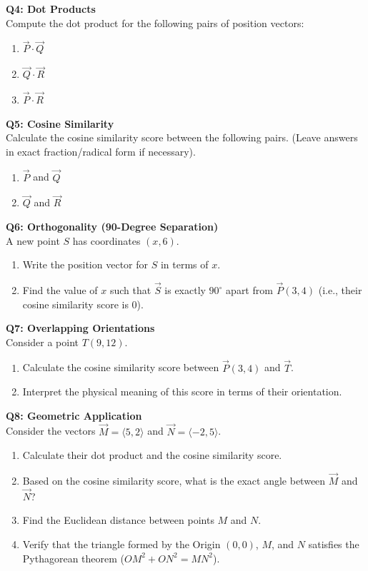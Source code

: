 \documentclass[11pt]{article}
\begin{document}
\textbf{Q4: Dot Products}\\
Compute the dot product for the following pairs of position vectors:
\begin{enumerate}
    \item[(a)] $\vec{P} \cdot \vec{Q}$
    \item[(b)] $\vec{Q} \cdot \vec{R}$
    \item[(c)] $\vec{P} \cdot \vec{R}$
\end{enumerate}

\textbf{Q5: Cosine Similarity}\\
Calculate the cosine similarity score between the following pairs. (Leave answers in exact fraction/radical form if necessary).
\begin{enumerate}
    \item[(a)] $\vec{P}$ and $\vec{Q}$
    \item[(b)] $\vec{Q}$ and $\vec{R}$
\end{enumerate}

\textbf{Q6: Orthogonality (90-Degree Separation)}\\
A new point $S$ has coordinates $(x, 6)$.
\begin{enumerate}
    \item[(a)] Write the position vector for $S$ in terms of $x$.
    \item[(b)] Find the value of $x$ such that $\vec{S}$ is exactly $90^\circ$ apart from $\vec{P}(3, 4)$ (i.e., their cosine similarity score is $0$).
\end{enumerate}

\textbf{Q7: Overlapping Orientations}\\
Consider a point $T(9, 12)$.
\begin{enumerate}
    \item[(a)] Calculate the cosine similarity score between $\vec{P}(3, 4)$ and $\vec{T}$.
    \item[(b)] Interpret the physical meaning of this score in terms of their orientation.
\end{enumerate}

\textbf{Q8: Geometric Application}\\
Consider the vectors $\vec{M} = \langle 5, 2 \rangle$ and $\vec{N} = \langle -2, 5 \rangle$.
\begin{enumerate}
    \item[(a)] Calculate their dot product and the cosine similarity score.
    \item[(b)] Based on the cosine similarity score, what is the exact angle between $\vec{M}$ and $\vec{N}$?
    \item[(c)] Find the Euclidean distance between points $M$ and $N$.
    \item[(d)] Verify that the triangle formed by the Origin $(0,0)$, $M$, and $N$ satisfies the Pythagorean theorem ($OM^2 + ON^2 = MN^2$).
\end{enumerate}
\end{document}
